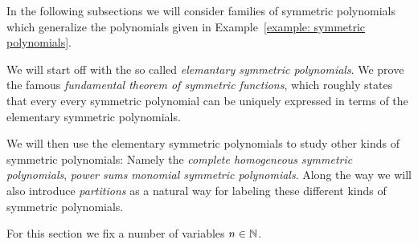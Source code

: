 \begin{fluff}
  In the following subsections we will consider families of symmetric polynomials which generalize the polynomials given in Example~\ref{example: symmetric polynomials}.
  
  We will start off with the so called \emph{elemantary symmetric polynomials}.
  We prove the famous \emph{fundamental theorem of symmetric functions}, which roughly states that every every symmetric polynomial can be uniquely expressed in terms of the elementary symmetric polynomials.
  
  We will then use the elementary symmetric polynomials to study other kinds of symmetric polynomials:
  Namely the \emph{complete homogeneous symmetric polynomials}, \emph{power sums} \emph{monomial symmetric polynomials}.
  Along the way we will also introduce \emph{partitions} as a natural way for labeling these different kinds of symmetric polynomials.
\end{fluff}


\begin{conventions}
  For this section we fix a number of variables $n \in \mathbb{N}$.
\end{conventions}














